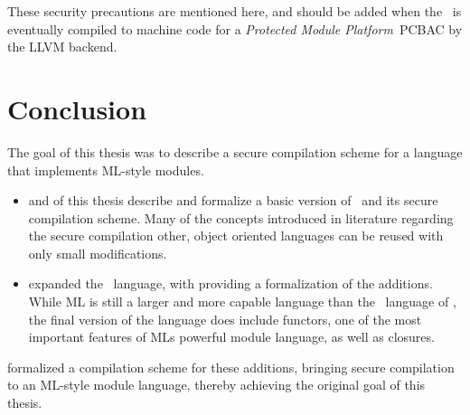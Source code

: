 \begin{itemize}
These security precautions are mentioned here, and should be added when the \LLVMIR\ is eventually compiled to machine code for a \emph{Protected Module Platform}~\cite{ref}{PCBAC} by the LLVM backend.
\end{itemize}


\section{Conclusion}
\label{sec:Conclusion}
The goal of this thesis was to describe a secure compilation scheme for a language that implements ML-style modules.
\begin{itemize}
\item
{} and  of this thesis describe and formalize a basic version of \MiniML\ and its secure compilation scheme.
Many of the concepts introduced in literature regarding the secure compilation other, object oriented languages can be reused with only small modifications.

\item
{} expanded the \MiniML\ language, with  providing a formalization of the additions.
While ML is  still a larger and more capable language than the \MiniML\ language of , the final version of the language does include functors, one of the most important features of MLs powerful module language, as well as closures.
\end{itemize}

 formalized a compilation scheme for these additions, bringing secure compilation to an ML-style module language, thereby achieving the original goal of this thesis. 
